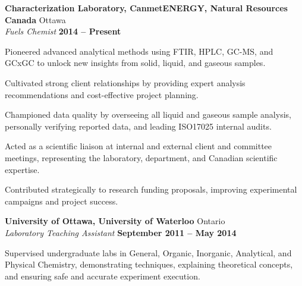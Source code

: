 \documentclass[margin,line]{resumecls}
\begin{document}
\begin{resume}
    \textbf{Characterization Laboratory, CanmetENERGY, Natural Resources Canada} \hfill Ottawa \\\vspace{1mm}%
    \textsl{Fuels Chemist} \hfill \textbf{2014 -- Present}\\\vspace{-5mm}%
    \begin{list2}
        \item Pioneered advanced analytical methods using FTIR, HPLC, GC-MS, and GCxGC to unlock new insights from solid, liquid, and gaseous samples.
        \item Cultivated strong client relationships by providing expert analysis recommendations and cost-effective project planning.
        \item Championed data quality by overseeing all liquid and gaseous sample analysis, personally verifying reported data, and leading ISO17025 internal audits.
        \item Acted as a scientific liaison at internal and external client and committee meetings, representing the laboratory, department, and Canadian scientific expertise.
        \item Contributed strategically to research funding proposals, improving experimental campaigns and project success.
    \end{list2}
    \textbf{University of Ottawa, University of Waterloo} \hfill Ontario \\\vspace{1mm}%
    \textsl{Laboratory Teaching Assistant} \hfill \textbf{September 2011 -- May 2014}\\\vspace{-5mm}%
    \begin{list2}
        \item Supervised undergraduate labs in General, Organic, Inorganic, Analytical, and Physical Chemistry, demonstrating techniques, explaining theoretical concepts, and ensuring safe and accurate experiment execution.
    \end{list2}


\end{resume}
\end{document}
